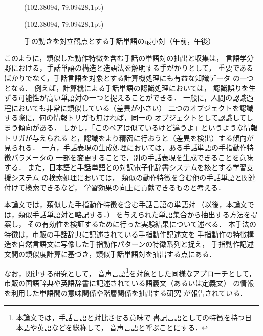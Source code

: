 \begin{figure}[htbp]
\begin{center}
    \begin{epsf}
    \end{epsf}
    \begin{draft}
\atari(102.38094, 79.09428,1pt)
    \end{draft}
    \begin{epsf}
    \end{epsf}
    \begin{draft}
\atari(102.38094, 79.09428,1pt)
    \end{draft}
\end{center}
\caption{手の動きを対立観点とする手話単語の最小対（午前，午後）}
\label{am and pm}
\end{figure}

このように，類似した動作特徴を含む手話の単語対の抽出と収集は，
言語学分野における，手話単語の構造と造語法を解明する手がかりとして，
重要であるばかりでなく，手話言語を対象とする計算機処理にも有益な知識データ
の一つとなる．
例えば，計算機による手話単語の認識処理においては，
認識誤りを生ずる可能性が高い単語対の一つと捉えることができる．
一般に，人間の認識過程においても非常に類似している（差異が小さい）
二つのオブジェクトを認識する際に，何の情報トリガも無ければ，同一の
オブジェクトとして認識してしまう傾向がある．
しかし，「このペアは似ているけど違うよ」というような情報トリガが与えられる
と，認識をより精密に行おうと（差異を検出）する傾向が見られる．
一方，手話表現の生成処理においては，ある手話単語の手指動作特徴パラメータの
一部を変更することで，別の手話表現を生成できることを意味する．
また，日本語と手話単語との対訳電子化辞書システムを核とする学習支援システム
の検索処理においては，
類似の動作特徴を含む他の手話単語と関連付けて検索できるなど，
学習効果の向上に貢献できるものと考える．

本論文では，類似した手指動作特徴を含む手話言語の単語対
（以後，本論文では，{\gt 類似手話単語対}と略記する．）
を与えられた単語集合から抽出する方法を提案し，
その有効性を検証するために行った実験結果について述べる．
本手法の特徴は，市販の手話辞典に記述されている手指動作記述文を
手指動作の特徴構造を自然言語文に写像した手指動作パターンの特徴系列と捉え，
手指動作記述文間の類似度計算に基づき，類似手話単語対を抽出する点にある．

なお，関連する研究として，
音声言語\footnote{本論文では，手話言語と対比させる意味で
書記言語としての特徴を持つ日本語や英語などを総称して，
音声言語と呼ぶことにする．}を対象とした同様なアプローチとして，
市販の国語辞典や英語辞書に記述されている語義文（あるいは定義文）
の情報を利用した単語間の意味関係や階層関係を抽出する研究
\cite[など]{Nakamura1987,Tomiura1991,Tsurumaru1992,Niwa1993}が報告されている．

